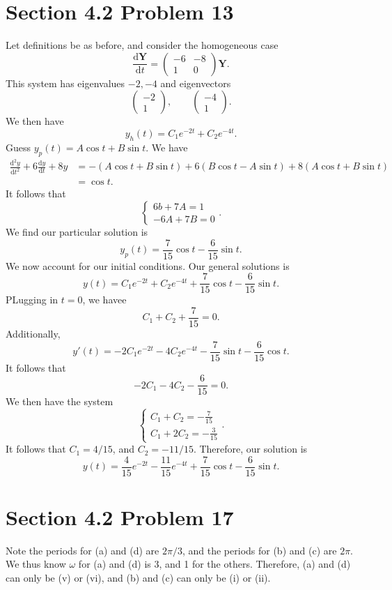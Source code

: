 \documentclass[11pt, letterpaper]{report}
\begin{document}
\section*{Section 4.2 Problem 13}
Let definitions be as before, and consider the homogeneous case
\[
	\frac{\mathrm{d}\mathbf{Y}}{\mathrm{d}t} =\begin{pmatrix}
		-6&-8\\
		1&0
	\end{pmatrix} \mathbf{Y}
.\]
This system has eigenvalues $-2,-4$ and eigenvectors
\[
	\begin{pmatrix}
		-2\\
		1
	\end{pmatrix} ,\qquad \begin{pmatrix}
		-4\\
		1
	\end{pmatrix} 
.\]
We then have
\[
	y_h(t)=C_1e^{-2t}+C_2e^{-4t}
.\]
Guess $y_p(t)=A\cos t+B\sin t$. We have
\begin{align*}
	\frac{\mathrm{d}^2y}{\mathrm{d}t^2} +6 \frac{\mathrm{d}y}{\mathrm{d}t} +8y&=-(A\cos t+B\sin t)+6(B\cos t-A\sin t)+8(A\cos t+B\sin t)\\
										  &=\cos t
.\end{align*}
It follows that
\[
	\begin{cases}
		6b+7A=1\\
		-6A+7B=0
	\end{cases}
.\]
We find our particular solution is
\[
	y_p(t)=\frac{7}{15}\cos t-\frac{6}{15}\sin t
.\]
We now account for our initial conditions. Our general solutions is
\[
	y(t)=C_1e^{-2t}+C_2e^{-4t}+\frac{7}{15}\cos t-\frac{6}{15}\sin t
.\]
PLugging in $t=0$, we havee
\[
	C_1+C_2+\frac{7}{15}=0
.\]
Additionally,
\[
	y'(t)=-2C_1e^{-2t}-4C_2e^{-4t}-\frac{7}{15}\sin t-\frac{6}{15}\cos t
.\]
It follows that
\[
	-2C_1-4C_2-\frac{6}{15}=0
.\]
We then have the system
\[
	\begin{cases}
		C_1+C_2=-\frac{7}{15}\\
		C_1+2C_2=-\frac{3}{15}
	\end{cases}
.\]
It follows that $C_1 = 4 /15$, and $C_2 =- 11 /15$. Therefore, our solution is
\[
	y(t)=\frac{4}{15}e^{-2t}-\frac{11}{15}e^{-4t}+\frac{7}{15}\cos t-\frac{6}{15}\sin t
.\]
\section*{Section 4.2 Problem 17}
Note the periods for (a) and (d) are $2\pi /3$, and the periods for (b) and (c) are $2\pi $. We thus know $\omega $ for (a) and (d) is 3, and 1 for the others. Therefore, (a) and (d) can only be (v) or (vi), and (b) and (c) can only be (i) or (ii).
\end{document}
